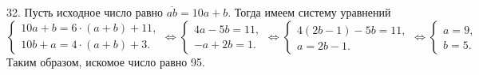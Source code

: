 32. Пусть исходное число равно $\overline{ab}=10a+b.$ Тогда имеем систему уравнений \\$\begin{cases} 10a+b=6\cdot(a+b)+11,\\ 10b+a=4\cdot(a+b)+3.\end{cases}\Leftrightarrow \begin{cases} 4a-5b=11,\\ -a+2b=1.\end{cases}\Leftrightarrow \begin{cases} 4(2b-1)-5b=11,\\ a=2b-1.\end{cases}
\Leftrightarrow \begin{cases} a=9,\\ b=5.\end{cases}$ Таким образом, искомое число равно 95.\\
